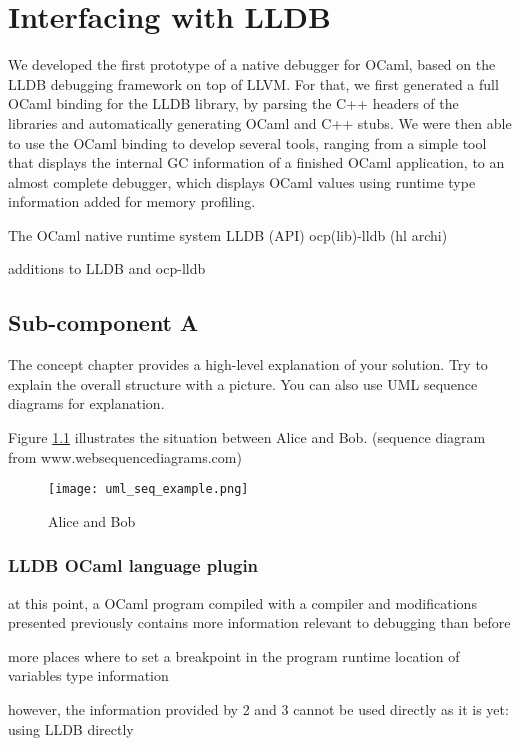 \chapter{Interfacing with LLDB\label{cha:chapter4}}


We developed the first prototype of a native debugger for OCaml, based on the LLDB debugging framework on top of LLVM. For that, we first generated a full OCaml binding for the LLDB library, by parsing the C++ headers of the libraries and automatically generating OCaml and C++ stubs. We were then able to use the OCaml binding to develop several tools, ranging from a simple tool that displays the internal GC information of a finished OCaml application, to an almost complete debugger, which displays OCaml values using runtime type information added for memory profiling.

The OCaml native runtime system
LLDB (API)
ocp(lib)-lldb (hl archi)

additions to LLDB and ocp-lldb

\section{Sub-component A\label{sec:conceptsuba}}
The concept chapter provides a high-level explanation of your solution. Try to explain the overall structure with a picture. You can also use UML sequence diagrams for explanation.

Figure \ref{fig:aliceandbob} illustrates the situation between Alice and Bob. (sequence diagram from www.websequencediagrams.com)

\begin{figure}[htb]
  \centering
  \texttt{[image: uml\_seq\_example.png]}\\
  \caption{Alice and Bob}
  \label{fig:aliceandbob}
\end{figure}

\subsection{LLDB OCaml language plugin}

at this point, a OCaml program compiled with a compiler and modifications
presented previously contains more information relevant to debugging than before

more places where to set a breakpoint in the program
runtime location of variables
type information

however, the information provided by 2 and 3 cannot be used directly as it is yet:
using LLDB directly



